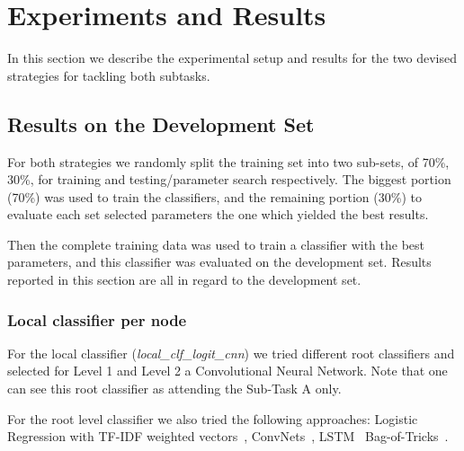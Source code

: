 \documentclass[11pt,a4paper]{article}
\begin{document}



\section{Experiments and Results}\label{experiments}

In this section we describe the experimental setup and results for the two
devised strategies for tackling both subtasks.

\subsection{Results on the Development Set}

For both strategies we randomly split the training set into two sub-sets, of
70\%, 30\%, for training and testing/parameter search respectively. The biggest
portion (70\%) was used to train the classifiers, and the remaining portion (30\%)
to evaluate each set selected parameters the one which yielded the best results.

Then the complete training data was used to train a classifier with the best
parameters, and this classifier was evaluated on the development set. Results
reported in this section are all in regard to the development set.


\subsubsection{Local classifier per node}

For the local classifier (\textit{local\_clf\_logit\_cnn}) we tried different root
classifiers and selected for Level 1 and Level 2 a Convolutional Neural Network.
Note that one can see this root classifier as attending the Sub-Task A only.

For the root level classifier we also tried the following approaches:
Logistic Regression with TF-IDF weighted vectors~\cite{},
ConvNets~\cite{kim-2014-convolutional},
LSTM~\cite{Hochreiter:1997:LSM:1246443.1246450}
Bag-of-Tricks~\cite{joulin-etal-2017-bag}.
\end{document}
